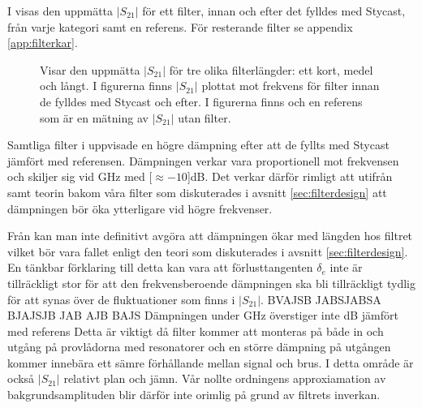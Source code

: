\documentclass[main.tex]{subfiles}
\begin{document}
I  visas den uppmätta $|S_{21}|$ för ett filter, innan och efter det fylldes med Stycast, från varje kategori samt en referens. För resterande filter se appendix \ref{app:filterkar}.

\begin{figure}[H]
    \centerfloat
    \begin{subfigure}[t]{0.329\textwidth}
        \centerfloat
        \setlength{}
        \setlength\figureheight{11em}
        
    \end{subfigure}
    \begin{subfigure}[t]{0.329\textwidth}
        \centerfloat
        \setlength{}
        \setlength\figureheight{11em}
        
    \end{subfigure}
    \begin{subfigure}[t]{0.329\textwidth}
        \centering
        \setlength{}
        \setlength\figureheight{11em}
        
    \end{subfigure}
    \caption{Visar den uppmätta $|S_{21}|$ för tre olika filterlängder: ett kort, medel och långt. I figurerna finns $|S_{21}|$ plottat mot frekvens för filter innan de fylldes med Stycast och efter. I figurerna finns och en referens som är en mätning av $|S_{21}|$ utan filter.}
    \label{fig:filter_kar}
\end{figure}

Samtliga filter i  uppvisade en högre dämpning efter att de fyllts med Stycast jämfört med referensen. Dämpningen verkar vara proportionell mot frekvensen och skiljer sig vid \unit[50]{GHz} med \unit[$\approx-10$]{dB}. Det verkar därför rimligt att utifrån  samt teorin bakom våra filter som diskuterades i avsnitt \ref{sec:filterdesign} att dämpningen bör öka ytterligare vid högre frekvenser.


Från  kan man inte definitivt avgöra att dämpningen ökar med längden hos filtret vilket bör vara fallet enligt den teori som diskuterades i avsnitt \ref{sec:filterdesign}. En tänkbar förklaring till detta kan vara att förlusttangenten $\delta_e$ inte är tillräckligt stor för att den frekvensberoende dämpningen ska bli tillräckligt tydlig för att synas över de fluktuationer som finns i $|S_{21}|$.%
BVAJSB JABSJABSA BJAJSJB JAB AJB BAJS
Dämpningen under \unit[10]{GHz} överstiger inte \unit[3]{dB} jämfört med referens Detta är viktigt då filter kommer att monteras på både in och utgång på provlådorna med resonatorer och en större dämpning på utgången kommer innebära ett sämre förhållande mellan signal och brus. I detta område är också $|S_{21}|$ relativt plan och jämn. Vår nollte ordningens approxiamation av bakgrundsamplituden blir därför inte orimlig på grund av filtrets inverkan.
\end{document}
